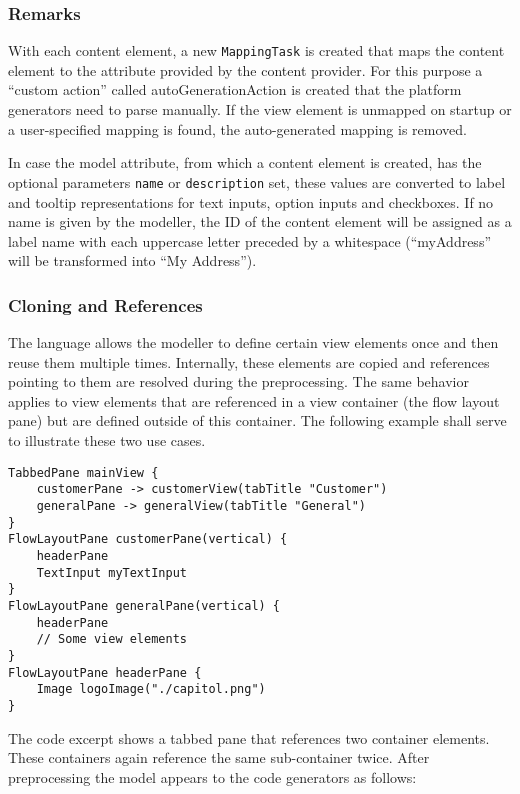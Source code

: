 \subsubsection{Remarks}
With each content element, a new \lstinline!MappingTask! is created that maps the content element to the attribute provided by the content provider. For this purpose a \enquote{custom action} called autoGenerationAction is created that the platform generators need to parse manually. If the view element is unmapped on startup or a user-specified mapping is found, the auto-generated mapping is removed.

In case the model attribute, from which a content element is created, has the optional parameters \lstinline!name! or \lstinline!description! set, these values are converted to label and tooltip representations for text inputs, option inputs and checkboxes. If no name is given by the modeller, the ID of the content element will be assigned as a label name with each uppercase letter preceded by a whitespace (\eg \enquote{myAddress} will be transformed into \enquote{My Address}).

\subsubsection{Cloning and References}
The \MD language allows  the modeller to define certain view elements once and then reuse them multiple times. Internally, these elements are copied and references pointing to them are resolved during the preprocessing. The same behavior applies to view elements that are referenced in a view container (\eg the flow layout pane) but are defined outside of this container. The following example shall serve to illustrate these two use cases.

\begin{lstlisting}[language=MD2]
TabbedPane mainView {
	customerPane -> customerView(tabTitle "Customer")
	generalPane -> generalView(tabTitle "General")
}
FlowLayoutPane customerPane(vertical) {
	headerPane
	TextInput myTextInput
}
FlowLayoutPane generalPane(vertical) {
	headerPane
	// Some view elements
}
FlowLayoutPane headerPane {
	Image logoImage("./capitol.png")
}
\end{lstlisting}

The code excerpt shows a tabbed pane that references two container elements. These containers again reference the same sub-container twice. After preprocessing the model appears to the code generators as follows:

